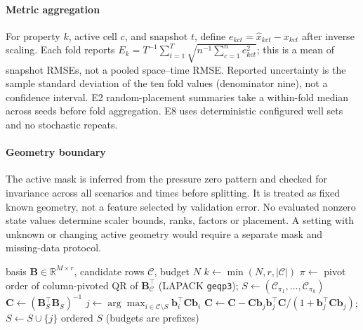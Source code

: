 \paragraph{Metric aggregation} For property $k$, active cell $c$, and snapshot $t$, define $e_{kct}=\hat{x}_{kct}-x_{kct}$ after inverse scaling. Each fold reports $E_k=T^{-1}\sum_{t=1}^{T}\sqrt{n^{-1}\sum_{c=1}^{n}e_{kct}^2}$; this is a mean of snapshot RMSEs, not a pooled space--time RMSE. Reported uncertainty is the sample standard deviation of the ten fold values (denominator nine), not a confidence interval. E2 random-placement summaries take a within-fold median across seeds before fold aggregation. E8 uses deterministic configured well sets and no stochastic repeats.

\paragraph{Geometry boundary} The active mask is inferred from the pressure zero pattern and checked for invariance across all scenarios and times before splitting. It is treated as fixed known geometry, not a feature selected by validation error. No evaluated nonzero state values determine scaler bounds, ranks, factors or placement. A setting with unknown or changing active geometry would require a separate mask and missing-data protocol.

\begin{algorithm}[htbp]
\caption{QR--DG grid-wide placement (study script \texttt{bss/placement.py::qr\_dg})}
\label{alg:S_qrdg}
\small
\begin{algorithmic}[1]
\Require basis $\mathbf{B}\in\mathbb{R}^{M\times r}$, candidate rows $\mathcal{C}$, budget $N$
\State $k\gets\min(N,r,|\mathcal{C}|)$
\State $\pi\gets$ pivot order of column-pivoted QR of $\mathbf{B}_{\mathcal{C}}^\top$ (LAPACK \texttt{geqp3}); $S\gets(\mathcal{C}_{\pi_1},\dots,\mathcal{C}_{\pi_k})$
  \State $\mathbf{C}\gets(\mathbf{B}_S^\top\mathbf{B}_S)^{-1}$
    \State $j\gets\arg\max_{i\in\mathcal{C}\setminus S}\mathbf{b}_i^\top\mathbf{C}\mathbf{b}_i$ 
    \State $\mathbf{C}\gets\mathbf{C}-\mathbf{C}\mathbf{b}_j\mathbf{b}_j^\top\mathbf{C}/(1+\mathbf{b}_j^\top\mathbf{C}\mathbf{b}_j)$; \quad $S\gets S\cup\{j\}$
  \EndFor
\EndIf
\State \Return ordered $S$ (budgets are prefixes)
\end{algorithmic}
\end{algorithm}

